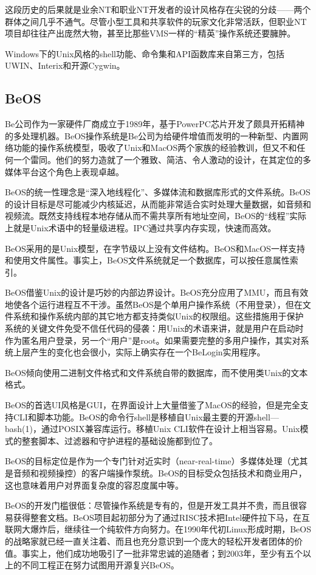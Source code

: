 \documentclass[12pt,oneside]{book}
\begin{document}
\begin{common-format}
这段历史的后果就是业余NT和职业NT开发者的设计风格存在尖锐的分歧——两个群体之间几乎不通气。尽管小型工具和共享软件的玩家文化非常活跃，但职业NT项目却往往产出庞然大物，甚至比那些VMS一样的“精英”操作系统还要臃肿。

Windows下的Unix风格的shell功能、命令集和API函数库来自第三方，包括UWIN、Interix和开源Cygwin。
 
\subsection{BeOS}
Be公司作为一家硬件厂商成立于1989年，基于PowerPC芯片开发了颇具开拓精神的多处理机器。BeOS操作系统是Be公司为给硬件增值而发明的一种新型、内置网络功能的操作系统模型，吸收了Unix和MacOS两个家族的经验教训，但又不和任何一个雷同。他们的努力造就了一个雅致、简洁、令人激动的设计，在其定位的多媒体平台这个角色上表现卓越。

BeOS的统一性理念是“深入地线程化”、多媒体流和数据库形式的文件系统。BeOS的设计目标是尽可能减少内核延迟，从而能非常适合实时处理大量数据，如音频和视频流。既然支持线程本地存储从而不需共享所有地址空间，BeOS的“线程”实际上就是Unix术语中的轻量级进程。IPC通过共享内存实现，快速而高效。

BeOS采用的是Unix模型，在字节级以上没有文件结构。BeOS和MacOS一样支持和使用文件属性。事实上，BeOS文件系统就足一个数据库，可以按任意属性索引。

BeOS借鉴Unix的设计是巧妙的内部边界设计。BeOS充分应用了MMU，而且有效地使各个运行进程互不干涉。虽然BeOS是个单用户操作系统（不用登录），但在文件系统和操作系统内部的其它地方都支持类似Unix的权限组。这些措施用于保护系统的关键文件免受不信任代码的侵袭：用Unix的术语来讲，就是用户在启动时作为匿名用户登录，另一个“用户”是root。如果需要完整的多用户操作，其实对系统上层产生的变化也会很小，实际上确实存在一个BeLogin实用程序。

BeOS倾向使用二进制文件格式和文件系统自带的数据库，而不使用类Unix的文本格式。

BeOS的首选UI风格是GUI，在界面设计上大量借鉴了MacOS的经验，但是完全支持CLI和脚本功能。BeOS的命令行shell是移植自Unix最主要的开源shell—bash(1)，通过POSIX兼容库运行。移植Unix CLI软件在设计上相当容易。Unix模式的整套脚本、过滤器和守护进程的基础设施都到位了。

BeOS的目标定位是作为一个专门针对近实时（near-real-time）多媒体处理（尤其是音频和视频操控）的客户端操作泵统。BeOS的目标受众包括技术和商业用户，这也意味着用户对界面复杂度的容忍度属中等。

BeOS的开发门槛很低：尽管操作系统是专有的，但是开发工具并不贵，而且很容易获得整套文档。BeOS项目起初部分为了通过RISC技术把Intel硬件拉下马，在互联网大爆炸后，继续往一个纯软件方向努力。在1990年代初Linux形成时期，BeOS的战略家就已经一直关注着、而且也充分意识到一个庞大的轻松开发者团体的价值。事实上，他们成功地吸引了一批非常忠诚的追随者；到2003年，至少有五个以上的不同工程正在努力试图用开源复兴BeOS。


\end{common-format}
\end{document}
